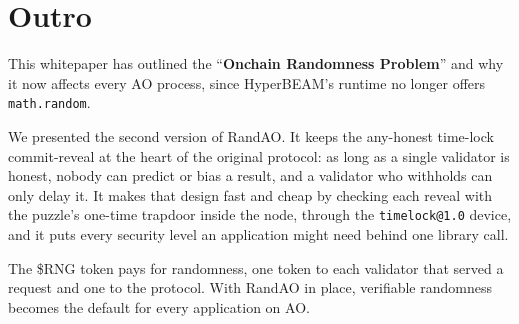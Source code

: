 \section{Outro}\label{sec:outro}

This whitepaper has outlined the ``\textbf{Onchain Randomness Problem}'' and why it now affects every AO process, since HyperBEAM's runtime no longer offers \texttt{math.random}.

We presented the second version of RandAO. It keeps the any-honest time-lock commit-reveal at the heart of the original protocol: as long as a single validator is honest, nobody can predict or bias a result, and a validator who withholds can only delay it. It makes that design fast and cheap by checking each reveal with the puzzle's one-time trapdoor inside the node, through the \texttt{timelock@1.0} device, and it puts every security level an application might need behind one library call.

The \$RNG token pays for randomness, one token to each validator that served a request and one to the protocol. With RandAO in place, verifiable randomness becomes the default for every application on AO.
